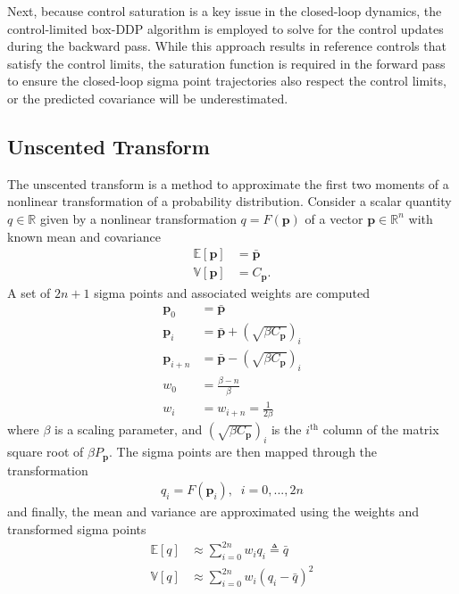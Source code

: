 \documentclass[journal ]{new-aiaa}
\newcommand{\param}{\ensuremath{\mathbf{p}}}
\newcommand{\E}[1]{\mathbb{E}\left[#1\right]}
\newcommand{\V}[1]{\mathbb{V}[#1]}
\newcommand{\cov}{C}
\begin{document}
Next, because control saturation is a key issue in the closed-loop dynamics, the control-limited box-DDP algorithm \cite{DDP_ControlLimited} is employed to solve for the control updates during the backward pass. While this approach results in reference controls that satisfy the control limits, the saturation function is required in the forward pass to ensure the closed-loop sigma point trajectories also respect the control limits, or the predicted covariance will be underestimated.

\subsection*{Unscented Transform}
The unscented transform is a method to approximate the first two moments of a nonlinear transformation of a probability distribution. Consider a scalar quantity $q\in\mathbb{R}$ given by a nonlinear transformation $q = F(\param)$ of a vector $\param\in\mathbb{R}^n$ with known mean and covariance
\begin{align*}
\E{\param} &= \bar{\param}\\
\V{\param} &= \cov_{\param}.
\end{align*}
A set of $2n+1$ sigma points and associated weights are computed 
\begin{align*}
\param_0 &= \bar{\param} \\
\param_i &=  \bar{\param} + \left(\sqrt{\beta \cov_{\param}}\right)_i \\
\param_{i+n} &=  \bar{\param} - \left(\sqrt{\beta\cov_{\param}}\right)_i \\
w_0 &= \frac{\beta - n}{\beta} \\
w_i &= w_{i+n} = \frac{1}{2\beta}
\end{align*}
where $\beta$ is a scaling parameter, and $\left(\sqrt{\beta \cov_{\param}}\right)_i$ is the $i^{\mathrm{th}}$ column of the matrix square root of $\beta P_{\param}$. The sigma points are then mapped through the transformation
\begin{align}
q_i = F(\param_i),\;\;i=0,...,2n
\end{align}
and finally, the mean and variance are approximated using the weights and transformed sigma points
\begin{align*}
\E{q} &\approx \sum_{i=0}^{2n}w_iq_i  \triangleq \bar{q}\\
\V{q} &\approx \sum_{i=0}^{2n}w_i\left(q_i - \bar{q}\right)^2
\end{align*}
\end{document}
